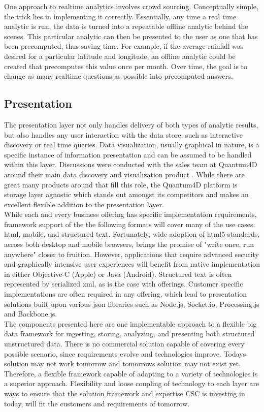 One approach to realtime analytics involves crowd sourcing. Conceptually simple, the trick lies in implementing it correctly. Essentially, any time a real time analytic is run, the data is turned into a repeatable offline analytic behind the scenes. This particular analytic can then be presented to the user as one that has been precomputed, thus saving time. For example, if the average rainfall was desired for a particular latitude and longitude, an offline analytic could be created that precomputes this value once per month. Over time, the goal is to change as many realtime questions as possible into precomputed answers.
\subsection{Presentation}
The presentation layer not only handles delivery of both types of analytic results, but also handles any user interaction with the data store, such as interactive discovery or real time queries. Data visualization, usually graphical in nature,  is a specific instance of information presentation and can be assumed to be handled within this layer. Discussions were conducted with the sales team at Quantum4D around their main data discovery and visualization product \cite{quantum}. While there are great many products around that fill this role, the Quantum4D platform is storage layer agnostic which stands out amongst its competitors and makes an excellent flexible addition to the presentation layer.\\

 While each and every business offering has specific implementation requirements, framework support of the the following formats will cover many of the use cases: \gls{html}, mobile, and structured text. Fortunately, wide adoption of \gls{html}5 standards, across both desktop and mobile browsers, brings the promise of "write once, run anywhere" closer to fruition. However, applications that require advanced security and graphically intensive user experiences will benefit from native implementation in either Objective-C (Apple) or Java (Android). Structured text is often represented by serialized \gls{xml}, as is the case with \climatedge offerings. Customer specific implementations are often required in any offering, which lead to presentation solutions built upon various \gls{json} libraries such as Node.js, Socket.io, Processing.js and Backbone.js.\\

The components presented here are one implementable approach to a flexible big data framework for ingesting, storing, analyzing, and presenting both structured unstructured data. There is no commercial solution capable of covering every possible scenario, since requirements evolve and technologies improve. Todays solution may not work tomorrow and tomorrows solution may not exist yet. Therefore, a flexible framework capable of adapting to a variety of technologies is a superior approach. Flexibility and loose coupling of technology to each layer are ways to ensure that the solution framework and expertise \textsc{CSC} is investing in today, will fit the customers and requirements of tomorrow.